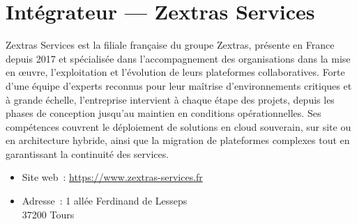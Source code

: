
\section{Intégrateur --- Zextras Services}
Zextras Services est la filiale française du groupe Zextras, présente
en France depuis 2017 et spécialisée dans l'accompagnement des
organisations dans la mise en œuvre, l'exploitation et l'évolution de
leurs plateformes collaboratives. Forte d'une équipe d'experts reconnus
pour leur maîtrise d'environnements critiques et à grande échelle,
l'entreprise intervient à chaque étape des projets, depuis les phases
de conception jusqu'au maintien en conditions opérationnelles. Ses
compétences couvrent le déploiement de solutions en cloud souverain,
sur site ou en architecture hybride, ainsi que la migration de
plateformes complexes tout en garantissant la continuité des services.

\begin{itemize}[nosep]
  \item Site web~: \url{https://www.zextras-services.fr}
  \item Adresse~: 1 allée Ferdinand de Lesseps\\
37200 Tours
\end{itemize}
